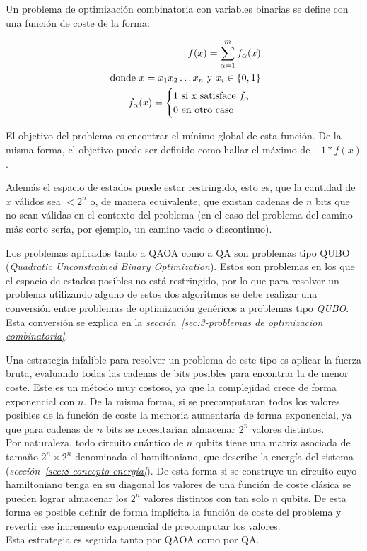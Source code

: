 Un problema de optimización combinatoria con variables binarias se define con una función de coste de la forma:

\begin{align}
  f(x) = \sum_{\alpha = 1}^{m} f_\alpha(x) \\
  \textnormal{ donde } x = x_1x_2 \ldots x_n \textnormal{ y } x_i\in{\{0, 1\}} \nonumber \\
   f_{\alpha}(x) = \begin{cases} \nonumber
     1 \textnormal{ si x satisface } f_\alpha \\
     0 \textnormal{ en otro caso}
   \end{cases}
\end{align}

El objetivo del problema es encontrar el mínimo global de esta función. De la misma forma, el objetivo puede ser definido como hallar el máximo de $-1*f(x)$.

Además el espacio de estados puede estar restringido, esto es, que la cantidad de $x$ válidos sea $< 2^n$ o, de manera equivalente, que existan cadenas de $n$ bits que no sean válidas en el contexto del problema (en el caso del problema del camino más corto sería, por ejemplo, un camino vacío o discontinuo).

Los problemas aplicados tanto a QAOA como a QA son problemas tipo QUBO (\textit{Quadratic Unconstrained Binary Optimization}).
Estos son problemas en los que el espacio de estados posibles no está restringido, por lo que para resolver un problema utilizando alguno de estos dos algoritmos se debe realizar una conversión entre problemas de optimización genéricos a problemas tipo \textit{QUBO}. Esta conversión se explica en la \textit{sección~\ref{sec:3-problemas de optimizacion combinatoria}}.

Una estrategia infalible para resolver un problema de este tipo es aplicar la fuerza bruta, evaluando todas las cadenas de bits posibles para encontrar la de menor coste.
Este es un método muy costoso, ya que la complejidad crece de forma exponencial con $n$.
De la misma forma, si se precomputaran todos los valores posibles de la función de coste la memoria aumentaría de forma exponencial, ya que para cadenas de $n$ bits se necesitarían almacenar $2^n$ valores distintos.
\\
Por naturaleza, todo circuito cuántico de $n$ qubits tiene una matriz asociada de tamaño $2^n \times 2^n$ denominada el hamiltoniano, que describe la energía del sistema (\textit{sección~\ref{sec:8-concepto-energia}}).
De esta forma si se construye un circuito cuyo hamiltoniano tenga en su diagonal los valores de una función de coste clásica se pueden lograr almacenar los $2^n$ valores distintos con tan solo $n$ qubits.
De esta forma es posible definir de forma implícita la función de coste del problema y revertir ese incremento exponencial de precomputar los valores.
\\
Esta estrategia es seguida tanto por QAOA como por QA\@.


